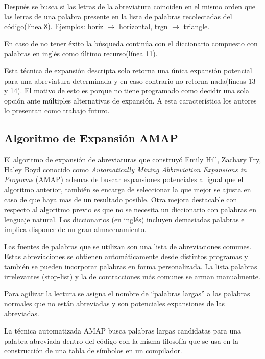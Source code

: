 \documentclass[a4paper,12pt]{report}
\begin{document}
Después se busca si las letras de la abreviatura coinciden en el mismo orden que las letras de una palabra presente en la lista de palabras recolectadas del código(línea 8). Ejemplos: \textsf{horiz} $\rightarrow$ \textsf{horizontal}, \textsf{trgn} $\rightarrow$ \textsf{triangle}.

En caso de no tener éxito la búsqueda continúa con el diccionario compuesto con palabras en inglés como último recurso(línea 11).


Esta técnica de expansión descripta solo retorna una única expansión potencial para una abreviatura determinada y en caso contrario no retorna nada(líneas 13 y 14). El motivo de esto es porque no tiene programado como decidir una sola opción ante múltiples alternativas de expansión. A esta característica los autores lo presentan como trabajo futuro\cite{LFBEX07,EZH08}.

\subsection{Algoritmo de Expansión AMAP}

El algoritmo de expansión de abreviaturas que construyó Emily Hill, Zachary Fry, Haley Boyd\cite{EZH08} conocido como \textit{Automatically Mining Abbreviation Expansions in Programs} (AMAP) ademas de buscar expansiones potenciales al igual que el algoritmo anterior, también se encarga de seleccionar la que mejor se ajusta en caso de que haya mas de un resultado posible. Otra mejora destacable con respecto al algoritmo previo es que no se necesita un diccionario con palabras en lenguaje natural. Los diccionarios (en inglés) incluyen demasiadas palabras e implica disponer de un gran almacenamiento. 

Las fuentes de palabras que se utilizan son una lista de abreviaciones comunes. Estas abreviaciones se obtienen automáticamente desde distintos programas y también se pueden incorporar palabras en forma personalizada. La lista palabras irrelevantes (stop-list) y la de contracciones más comunes se arman manualmente.

Para agilizar la lectura se asigna el nombre de “palabras largas” a las palabras normales que no están abreviadas y son potenciales expansiones de las abreviadas.

La técnica automatizada AMAP busca palabras largas candidatas para una palabra abreviada dentro del código con la misma filosofía que se usa en la construcción de una tabla de símbolos en un compilador.
\end{document}
